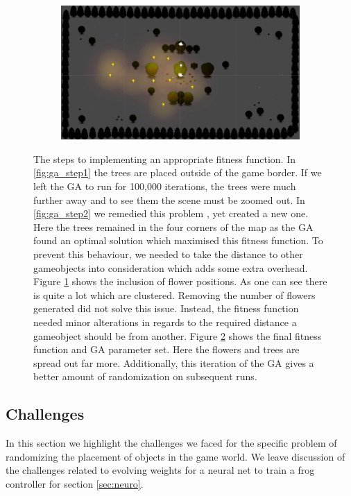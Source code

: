 \begin{figure}[h]
\begin{subfigure}[b]{0.5\linewidth}
                \caption{}
                \label{fig:ga_step3}
        \end{subfigure}
        \begin{subfigure}[b]{0.49\linewidth}
               \includegraphics[width=\linewidth]{./ga_final}
           	   \caption{}
               \label{fig:ga_step4}
        \end{subfigure}
        \caption{The steps to implementing an appropriate fitness function. In \ref{fig:ga_step1} the trees are placed 
        outside of the game border. If we left the GA to run for 100,000 iterations, the trees were much further away and 
        to see them the scene must be zoomed out. In \ref{fig:ga_step2} we remedied this problem , yet created a new one. 
        Here the trees remained in the four corners of the map as the GA found an optimal solution which maximised this 
        fitness function. To prevent this behaviour, we needed to take the distance to other gameobjects into consideration which adds some extra overhead. Figure \ref{fig:ga_step3} shows 
        the inclusion of flower positions. As one can see there is quite a lot which are clustered. Removing the number of flowers generated did not solve this issue. Instead, the fitness function needed minor alterations in regards to the required distance a gameobject should be from another. Figure 
        \ref{fig:ga_step4} shows the final fitness function and GA parameter set. Here the flowers and trees are spread out 
        far more. Additionally, this iteration of the GA gives a better amount of randomization on subsequent 
        runs.}
        \label{fig:GA_Trees}
\end{figure}


\subsection{Challenges}
In this section we highlight the challenges we faced for the specific problem of randomizing
the placement of objects in the game world. We leave discussion of the challenges related to evolving weights
for a neural net to train a frog controller for section \ref{sec:neuro}.

